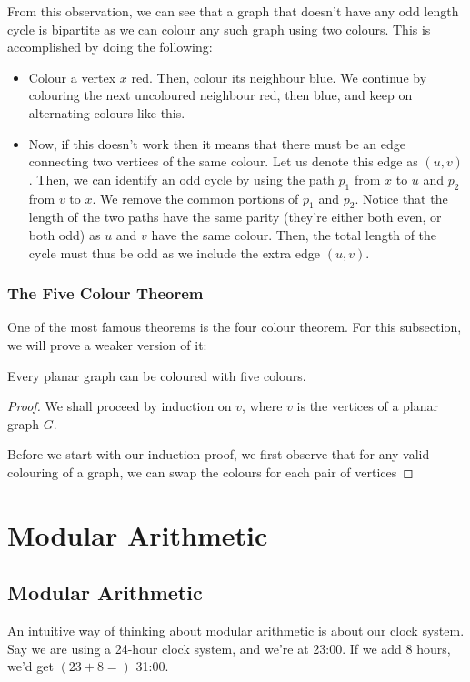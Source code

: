 \documentclass[openany]{book}
\begin{document}
From this observation, we can see that a graph that doesn't have any odd length cycle is bipartite as we can colour any such graph using two colours. This is accomplished by doing the following:
\begin{itemize}
	\item Colour a vertex $x$ red. Then, colour its neighbour blue. We continue by colouring the next uncoloured neighbour red, then blue, and keep on alternating colours like this.
	
	\item Now, if this doesn't work then it means that there must be an edge connecting two vertices of the same colour. Let us denote this edge as $(u,v)$. Then, we can identify an odd cycle by using the path $p_{1}$ from $x$ to $u$ and $p_{2}$ from $v$ to $x$. We remove the common portions of $p_{1}$ and $p_{2}$. Notice that the length of the two paths have the same parity (they're either both even, or both odd) as $u$ and $v$ have the same colour. Then, the total length of the cycle must thus be odd as we include the extra edge $(u,v)$.
\end{itemize}

\subsection{The Five Colour Theorem}
One of the most famous theorems is the four colour theorem. For this subsection, we will prove a weaker version of it:
\begin{thm}
	Every planar graph can be coloured with five colours.
\end{thm}
\begin{proof}
	We shall proceed by induction on $v$, where $v$ is the vertices of a planar graph $G$.
	
	Before we start with our induction proof, we first observe that for any valid colouring of a graph, we can swap the colours for each pair of vertices 
\end{proof}


\chapter{Modular Arithmetic}
\section{Modular Arithmetic}
An intuitive way of thinking about modular arithmetic is about our clock system. Say we are using a 24-hour clock system, and we're at 23:00. If we add 8 hours, we'd get $(23+8=)$ 31:00.
\end{document}
